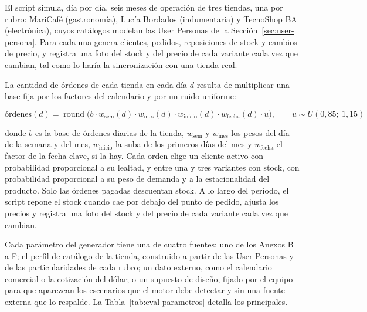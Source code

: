El script simula, día por día, seis meses de operación de tres tiendas, una por rubro: MariCafé (gastronomía), Lucía Bordados (indumentaria) y TecnoShop BA (electrónica), cuyos catálogos modelan las User Personas de la Sección~\ref{sec:user-persona}. Para cada una genera clientes, pedidos, reposiciones de stock y cambios de precio, y registra una foto del stock y del precio de cada variante cada vez que cambian, tal como lo haría la sincronización con una tienda real.

La cantidad de órdenes de cada tienda en cada día $d$ resulta de multiplicar una base fija por los factores del calendario y por un ruido uniforme:

\begin{equation}
\text{órdenes}(d) = \operatorname{round}\big(b \cdot w_{\text{sem}}(d) \cdot w_{\text{mes}}(d) \cdot w_{\text{inicio}}(d) \cdot w_{\text{fecha}}(d) \cdot u\big), \qquad u \sim U(0{,}85;\ 1{,}15)
\end{equation}

\noindent donde $b$ es la base de órdenes diarias de la tienda, $w_{\text{sem}}$ y $w_{\text{mes}}$ los pesos del día de la semana y del mes, $w_{\text{inicio}}$ la suba de los primeros días del mes y $w_{\text{fecha}}$ el factor de la fecha clave, si la hay. Cada orden elige un cliente activo con probabilidad proporcional a su lealtad, y entre una y tres variantes con stock, con probabilidad proporcional a su peso de demanda y a la estacionalidad del producto. Solo las órdenes pagadas descuentan stock. A lo largo del período, el script repone el stock cuando cae por debajo del punto de pedido, ajusta los precios y registra una foto del stock y del precio de cada variante cada vez que cambian.

Cada parámetro del generador tiene una de cuatro fuentes: uno de los Anexos B a F; el perfil de catálogo de la tienda, construido a partir de las User Personas y de las particularidades de cada rubro; un dato externo, como el calendario comercial o la cotización del dólar; o un supuesto de diseño, fijado por el equipo para que aparezcan los escenarios que el motor debe detectar y sin una fuente externa que lo respalde. La Tabla~\ref{tab:eval-parametros} detalla los principales.

